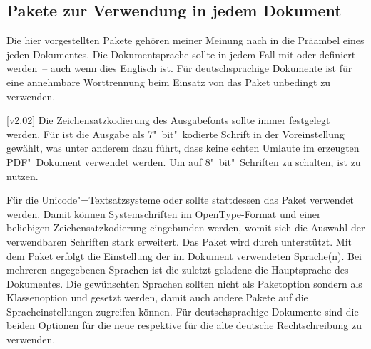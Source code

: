 \subsection{Pakete zur Verwendung in jedem Dokument}
%
Die hier vorgestellten Pakete gehören meiner Meinung nach in die Präambel eines 
jeden Dokumentes. Die Dokumentsprache sollte in jedem Fall mit  
oder  definiert werden~-- auch wenn dies Englisch ist. Für 
deutschsprachige Dokumente ist für eine annehmbare Worttrennung beim Einsatz 
von  das Paket  unbedingt zu verwenden.

\begin{DeclarePackages}
[v2.02]
  Die Zeichensatzkodierung des Ausgabefonts sollte immer festgelegt werden. Für 
   ist die Ausgabe als 7"~bit"~kodierte Schrift in der 
  Voreinstellung gewählt, was unter anderem dazu führt, dass keine echten
  Umlaute im erzeugten PDF"~Dokument verwendet werden. Um auf 8"~bit"~Schriften
  zu schalten, ist  zu nutzen.
  
  Für die Unicode"=Textsatzsysteme  oder  
  sollte stattdessen das Paket  verwendet werden. Damit 
  können Systemschriften im OpenType-Format und einer beliebigen 
  Zeichensatzkodierung eingebunden werden, womit sich die Auswahl der 
  verwendbaren Schriften stark erweitert. Das Paket wird durch \TUDScript 
  unterstützt.
  Mit dem Paket  erfolgt die Einstellung der im Dokument 
  verwendeten Sprache(n). Bei mehreren angegebenen Sprachen ist die zuletzt 
  geladene die Hauptsprache des Dokumentes. Die gewünschten Sprachen sollten 
  nicht als Paketoption sondern als Klassenoption und gesetzt werden, damit 
  auch andere Pakete auf die Spracheinstellungen zugreifen können. Für 
  deutschsprachige Dokumente sind die beiden Optionen  für die 
  neue respektive  für die alte deutsche Rechtschreibung zu 
  verwenden. 
  

\end{DeclarePackages}
